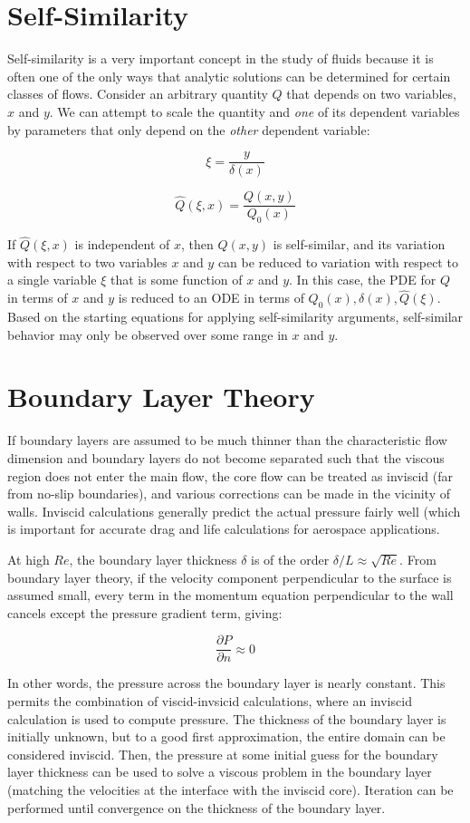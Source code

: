 \documentclass[10pt]{article}
\newcommand{\beq}{\begin{equation}}
\newcommand{\eeq}{\end{equation}}
\begin{document}
\begin{flushleft}
\section{Self-Similarity}
Self-similarity is a very important concept in the study of fluids because it is often one of the only ways that  analytic solutions can be determined for certain classes of flows. Consider an arbitrary quantity \(Q\) that depends on two variables, \(x\) and \(y\). We can attempt to scale the quantity and \textit{one} of its dependent variables by parameters that only depend on the \textit{other} dependent variable:

\beq
\xi=\frac{y}{\delta(x)}
\eeq

\beq
\hat{Q}(\xi,x)=\frac{Q(x,y)}{Q_0(x)}
\eeq

If \(\hat{Q}(\xi,x)\) is independent of \(x\), then \(Q(x,y)\) is self-similar, and its variation with respect to two variables \(x\) and \(y\) can be reduced to variation with respect to a single variable \(\xi\) that is some function of \(x\) and \(y\). In this case, the PDE for \(Q\) in terms of \(x\) and \(y\) is reduced to an ODE in terms of \(Q_0(x), \delta(x), \hat{Q}(\xi)\). Based on the starting equations for applying self-similarity arguments, self-similar behavior may only be observed over some range in \(x\) and \(y\). 

\section{Boundary Layer Theory}
If boundary layers are assumed to be much thinner than the characteristic flow dimension and boundary layers do not become separated such that the viscous region does not enter the main flow, the core flow can be treated as inviscid (far from no-slip boundaries), and various corrections can be made in the vicinity of walls. Inviscid calculations generally predict the actual pressure fairly well (which is important for accurate drag and life calculations for aerospace applications. 

At high \(Re\), the boundary layer thickness \(\delta\) is of the order \(\delta/L\approx\sqrt{Re}\). From boundary layer theory, if the velocity component perpendicular to the surface is assumed small, every term in the momentum equation perpendicular to the wall cancels except the pressure gradient term, giving:

\beq
\frac{\partial P}{\partial n}\approx 0
\eeq

In other words, the pressure across the boundary layer is nearly constant. This permits the combination of viscid-invsicid calculations, where an inviscid calculation is used to compute pressure. The thickness of the boundary layer is initially unknown, but to a good first approximation, the entire domain can be considered inviscid. Then, the pressure at some initial guess for the boundary layer thickness can be used to solve a viscous problem in the boundary layer (matching the velocities at the interface with the inviscid core). Iteration can be performed until convergence on the thickness of the boundary layer.


\end{flushleft}
\end{document}
